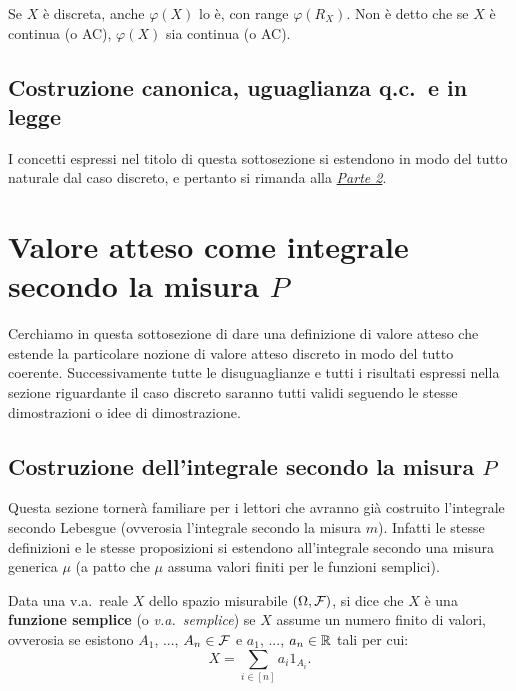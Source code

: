 \begin{multicols*}{2}
\begin{remark}
    Se $X$ è discreta, anche $\varphi(X)$ lo è, con range
    $\varphi(R_X)$. Non è detto che se $X$ è continua (o AC),
    $\varphi(X)$ sia continua (o AC).
\end{remark}

\subsection{Costruzione canonica, uguaglianza q.c.~e in legge}

I concetti espressi nel titolo di questa sottosezione si estendono
in modo del tutto naturale dal caso discreto, e pertanto si rimanda
alla \textit{\hyperref[sec:uguaglianza_qc]{Parte 2}}.

\section{Valore atteso come integrale secondo la misura \texorpdfstring{$P$}{P}}

Cerchiamo in questa sottosezione di dare una definizione di valore
atteso che estende la particolare nozione di valore atteso discreto
in modo del tutto coerente. Successivamente tutte le disuguaglianze
e tutti i risultati espressi nella sezione riguardante il caso
discreto saranno tutti validi seguendo le stesse dimostrazioni o
idee di dimostrazione.

\subsection{Costruzione dell'integrale secondo la misura \texorpdfstring{$P$}{P}}

Questa sezione tornerà familiare per i lettori che avranno già costruito
l'integrale secondo Lebesgue (ovverosia l'integrale secondo la misura
$m$). Infatti le stesse definizioni e le stesse proposizioni si
estendono all'integrale secondo una misura generica $\mu$ (a patto
che $\mu$ assuma valori finiti per le funzioni semplici).

\begin{definition}
    Data una v.a.~reale $X$ dello spazio misurabile
    $(\Omega, \mathcal{F})$, si dice che $X$ è una
    \textbf{funzione semplice} (o \textit{v.a.~semplice}) se $X$ assume un numero
    finito di valori, ovverosia se esistono $A_1$, ...,
    $A_n \in \mathcal{F}$ e $a_1$, ..., $a_n \in \mathbb{R}$ tali
    per cui:
    \[
        X = \sum_{i \in [n]} a_i 1_{A_i}.
    \] 
\end{definition}


\end{multicols*}

